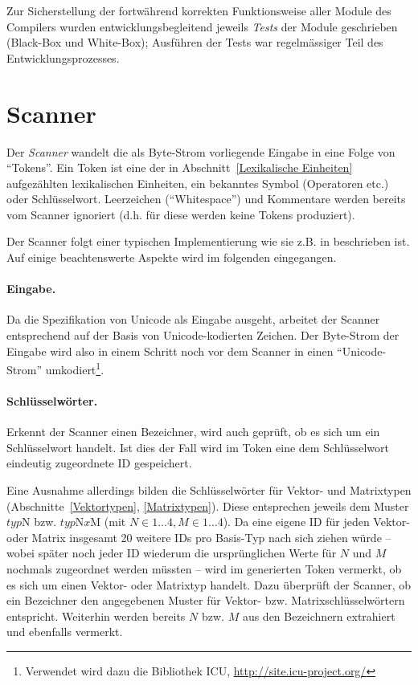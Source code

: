 \documentclass[twoside,a4paper,fleqn,12pt]{book}
\begin{document}
Zur Sicherstellung der fortwährend korrekten Funktionsweise aller Module des Compilers wurden entwicklungsbegleitend 
jeweils \emph{Tests} der Module geschrieben (Black-Box und White-Box); Ausführen der Tests war regelmässiger Teil des Entwicklungsprozesses.
 
\section{Scanner}

Der \emph{Scanner} wandelt die als Byte-Strom vorliegende Eingabe in eine Folge von "`Tokens"'.
Ein Token ist eine der in Abschnitt~\ref{Lexikalische Einheiten} aufgezählten lexikalischen Einheiten, ein bekanntes Symbol (Operatoren etc.) oder Schlüsselwort. 
Leerzeichen (``Whitespace'') und Kommentare werden bereits vom Scanner ignoriert (d.h. für diese werden keine Tokens produziert).

Der Scanner folgt einer typischen Implementierung wie sie z.B. in \cite{wirth_compiler} beschrieben ist. Auf einige beachtenswerte Aspekte
wird im folgenden eingegangen.

\paragraph{Eingabe.} Da die Spezifikation von Unicode als Eingabe ausgeht, arbeitet der Scanner entsprechend auf der Basis von Unicode-kodierten Zeichen.
Der Byte-Strom der Eingabe wird also in einem Schritt noch vor dem Scanner in einen "`Unicode-Strom"' umkodiert\footnote{Verwendet wird dazu die Bibliothek ICU,
\url{http://site.icu-project.org/}}.

\paragraph{Schlüsselwörter.} Erkennt der Scanner einen Bezeichner, wird auch geprüft, ob es sich um ein Schlüsselwort handelt. Ist dies der Fall
wird im Token eine dem Schlüsselwort eindeutig zugeordnete ID gespeichert.

Eine Ausnahme allerdings bilden die Schlüsselwörter für Vektor- und Matrixtypen (Abschnitte~\ref{Vektortypen}, \ref{Matrixtypen}). Diese entsprechen
jeweils dem Muster $\mathit{typ}\mathrm{N}$ bzw. $\mathit{typ}\mathrm{N}\mathit{x}\mathrm{M}$ (mit $N \in 1 \dots 4, M \in 1 \dots 4$).
Da eine eigene ID für jeden Vektor- oder Matrix insgesamt 20 weitere IDs pro Basis-Typ nach sich ziehen würde -- wobei später noch jeder ID wiederum
die ursprünglichen Werte für $N$ und $M$ nochmals zugeordnet
werden müssten -- wird im generierten Token vermerkt, ob es sich um einen Vektor- oder Matrixtyp handelt.
Dazu überprüft der Scanner, ob ein Bezeichner den angegebenen Muster für Vektor- bzw. Matrixschlüsselwörtern entspricht.
Weiterhin werden bereits $N$ bzw. $M$ aus den Bezeichnern extrahiert und ebenfalls vermerkt.
\end{document}
